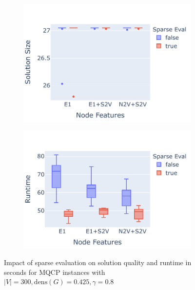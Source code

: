 \documentclass[draft,final]{vutinfth} %
\begin{document}
\begin{figure}
    \centering
    \begin{subfigure}{0.49\textwidth}
        \centering
        \includegraphics[width=\textwidth]{graphics/sparse-eval-2-size.pdf}
    \end{subfigure}
    \begin{subfigure}{0.49\textwidth}
        \centering
        \includegraphics[width=\textwidth]{graphics/sparse-eval-2-runtime.pdf}
    \end{subfigure}
    \caption{Impact of sparse evaluation on solution quality and runtime in seconds for MQCP instances with $|V| = 300, \mathrm{dens}(G)=0.425, \gamma=0.8$}
    \label{fig:sparse-evaluation-2}
\end{figure}

\end{document}
